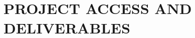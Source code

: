 \documentclass[letterpaper%
, oneside%
, 12pt%
, memoireprojet%
, english%
,creativecommons,hyperref, withAlgo2e %
]{thETS}
\begin{document}
\cleardoublepage
{}
\reversemarginpar

%
%
%
%
%
%
%
%
%


\chapter{PROJECT ACCESS AND DELIVERABLES}
\end{document}
